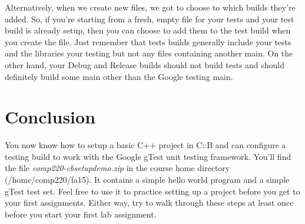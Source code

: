 \documentclass[10pt]{article}
\begin{document}
Alternatively, when we create new files, we got to choose to which builds they're added. So, if you're starting from a fresh, empty file for your tests and your test build is already setup, then you can choose to add them to the test build when you create the file. Just remember that tests builds generally include your tests and the libraries your testing but not any files containing another main. On the other hand, your Debug and Release builds should not build tests and should definitely build some main other than the Google testing main. 


\section{Conclusion}

You now know how to setup a basic C++ project in C::B and can configure a testing build to work with the Google gTest unit testing framework. You'll find the file \textit{comp220-cbsetupdemo.zip} in the course home directory (/home/comp220/fa15).  It contains a simple hello world program and a simple gTest test set. Feel free to use it to practice setting up a project before you get to your first assignments. Either way, try to walk through these steps at least once before you start your first lab assignment.
\end{document}
